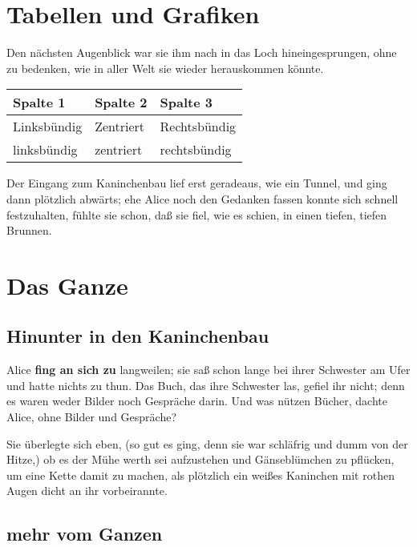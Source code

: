 \documentclass[DIV=calc,10pt,parskip=half,twocolumn]{scrartcl}
\begin{document}
\section{Tabellen und Grafiken}

Den nächsten Augenblick war sie ihm nach in das Loch hineingesprungen, ohne zu
bedenken, wie in aller Welt sie wieder herauskommen könnte.

\begin{center}
\begin{tabular}{lll}
  \toprule
   Spalte 1 &  Spalte 2 & Spalte 3\\
   \midrule
   Linksbündig & Zentriert & Rechtsbündig\\
   linksbündig & zentriert & rechtsbündig\\
   \bottomrule
\end{tabular}
\end{center}

Der Eingang zum Kaninchenbau lief erst geradeaus, wie ein Tunnel, und ging dann
plötzlich abwärts; ehe Alice noch den Gedanken fassen konnte sich schnell
festzuhalten, fühlte sie schon, daß sie fiel, wie es schien, in einen tiefen,
tiefen Brunnen.

\clearpage


\section{Das Ganze}



\subsection{Hinunter in den Kaninchenbau}

Alice {\bfseries fing an sich zu} langweilen; sie saß schon lange bei ihrer Schwester am
Ufer und hatte nichts zu thun. Das Buch, das ihre Schwester las, gefiel ihr
nicht; denn es waren weder Bilder noch Gespräche darin. \grqq{} Und was nützen
Bücher,\grqq{}  dachte Alice, \grqq{}ohne Bilder und Gespräche?\grqq 

Sie überlegte sich eben, (so gut es ging, denn sie war schläfrig und dumm von
der Hitze,) ob es der Mühe werth sei aufzustehen und Gänseblümchen zu pflücken,
um eine Kette damit zu machen, als plötzlich ein weißes Kaninchen mit rothen
Augen dicht an ihr vorbeirannte.

\subsection{mehr vom Ganzen}
\end{document}
